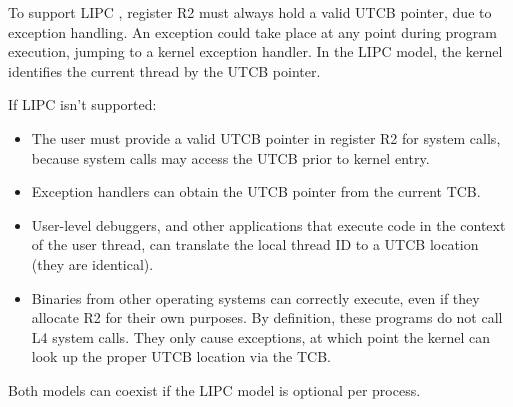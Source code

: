 \documentclass[a4paper]{article}
\begin{document}
To support LIPC \cite{liedtke01lazy}, register R2 must always hold a valid
UTCB pointer, due to exception handling.  An exception could take
place at any point during program execution, jumping to a kernel exception
handler.  In the LIPC model, the kernel identifies the current thread by the 
UTCB pointer.

If LIPC isn't supported:
\begin{itemize}
\item The user must provide a valid UTCB pointer in register R2 for system 
      calls, because system calls may access the UTCB prior to kernel entry.
\item Exception handlers can obtain the UTCB pointer from the current TCB.
\item User-level debuggers, and other applications that execute code in the 
      context of the user thread, can translate the local thread ID to
      a UTCB location (they are identical).
\item Binaries from other operating systems can correctly
  execute, even if they allocate R2 for their own purposes.  By definition,
  these programs do not call L4 system calls.  They only cause 
  exceptions, at which point the kernel can look up the proper UTCB location
  via the TCB.
\end{itemize}

Both models can coexist if the LIPC model is optional per process.




\end{document}
